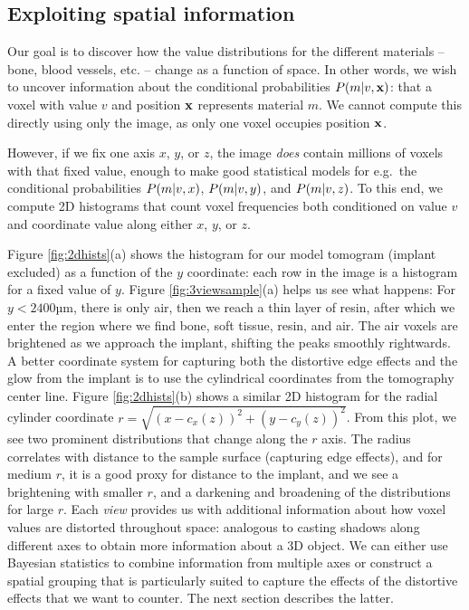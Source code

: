 \subsection{Exploiting spatial information}
Our goal is to discover how the value distributions for the different materials
-- bone, blood vessels, etc. -- change as a function of space. In other words,
we wish to uncover information about the conditional probabilities
$P\!\left(m\middle\vert v,\mathbf{x}\right)$: that a voxel with value $v$ and position $\mathbf{x}$ represents
material $m$. We cannot compute this directly using only the image, as only one
voxel occupies position $\mathbf{x}$.

However, if we fix one axis $x$, $y$, or $z$, the image {\em does} contain
millions of voxels with that fixed value, enough to make good statistical
models for e.g.~the conditional probabilities $P\!\left(m\middle\vert v,x\right)$, $P\!\left(m\middle\vert v,y\right)$,
and $P\!\left(m\middle\vert v,z\right)$. To this end, we compute 2D histograms that count voxel
frequencies both conditioned on value $v$ and coordinate value along either
$x$, $y$, or $z$.

Figure \ref{fig:2dhists}(a) shows the histogram for our model tomogram (implant
excluded) as a function of the $y$ coordinate: each row in the image is a
histogram for a fixed value of $y$. Figure \ref{fig:3viewsample}(a) helps us
see what happens: For $y<2400\text{µm}$, there is only air, then we reach a
thin layer of resin, after which we enter the region where we find bone, soft
tissue, resin, and air. The air voxels are brightened as we approach the
implant, shifting the peaks smoothly rightwards. A better coordinate system for
capturing both the distortive edge effects and the glow from the implant is to
use the cylindrical coordinates from the tomography center line. Figure
\ref{fig:2dhists}(b) shows a similar 2D histogram for the radial cylinder
coordinate $r=\sqrt{\left( x-c_x(z)\right)^2+\left( y-c_y(z)\right)^2}$. From
this plot, we see two prominent distributions that change along the $r$ axis.
The radius correlates with distance to the sample surface (capturing edge
effects), and for medium $r$, it is a good proxy for distance to the implant,
and we see a brightening with smaller $r$, and a darkening and broadening of
the distributions for large $r$. Each {\em view} provides us with additional
information about how voxel values are distorted throughout space: analogous to
casting shadows along different axes to obtain more information about a 3D
object. We can either use Bayesian statistics to combine information from
multiple axes or construct a spatial grouping that is particularly suited to
capture the effects of the distortive effects that we want to counter. The next
section describes the latter.

